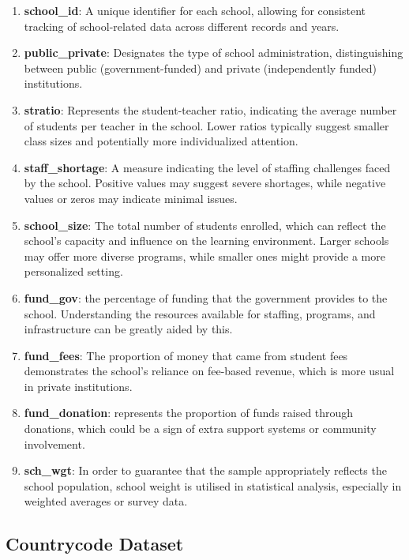 \documentclass[
  11pt,
  a4paper,
]{article}
\begin{document}
\begin{enumerate}
\def\labelenumi{\arabic{enumi}.}
\item
  \textbf{school\_id}: A unique identifier for each school, allowing for
  consistent tracking of school-related data across different records
  and years.
\item
  \textbf{public\_private}: Designates the type of school
  administration, distinguishing between public (government-funded) and
  private (independently funded) institutions.
\item
  \textbf{stratio}: Represents the student-teacher ratio, indicating the
  average number of students per teacher in the school. Lower ratios
  typically suggest smaller class sizes and potentially more
  individualized attention.
\item
  \textbf{staff\_shortage}: A measure indicating the level of staffing
  challenges faced by the school. Positive values may suggest severe
  shortages, while negative values or zeros may indicate minimal issues.
\item
  \textbf{school\_size}: The total number of students enrolled, which
  can reflect the school's capacity and influence on the learning
  environment. Larger schools may offer more diverse programs, while
  smaller ones might provide a more personalized setting.
\item
  \textbf{fund\_gov}: the percentage of funding that the government
  provides to the school. Understanding the resources available for
  staffing, programs, and infrastructure can be greatly aided by this.
\item
  \textbf{fund\_fees}: The proportion of money that came from student
  fees demonstrates the school's reliance on fee-based revenue, which is
  more usual in private institutions.
\item
  \textbf{fund\_donation}: represents the proportion of funds raised
  through donations, which could be a sign of extra support systems or
  community involvement.
\item
  \textbf{sch\_wgt}: In order to guarantee that the sample appropriately
  reflects the school population, school weight is utilised in
  statistical analysis, especially in weighted averages or survey data.
\end{enumerate}

\subsection{Countrycode Dataset}\label{countrycode-dataset}
\end{document}

